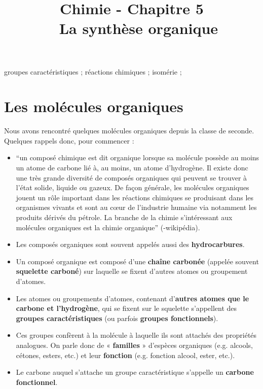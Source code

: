 \documentclass[11pt,a4paper]{article}
\title{\large Chimie - Chapitre 5 \\ \LARGE  La synthèse organique}
\date{}
\author{}
\begin{document}
\vspace{-2cm}

\maketitle
\vspace{-1cm}
\begin{tcolorbox}[title=Notions de la classe de première à rappeler]
groupes caractéristiques ; réactions chimiques ; isomérie ; 
\end{tcolorbox}
\tableofcontents

\section{Les molécules organiques}
Nous avons rencontré quelques molécules organiques depuis la classe de seconde. Quelques rappels donc, pour commencer : 

\begin{defn}{}
\begin{itemize}
    \item ``un composé chimique est dit organique lorsque sa molécule possède au moins un atome de carbone lié à, au moins, un atome d'hydrogène. Il existe donc une très grande diversité de composés organiques qui peuvent se trouver à l'état solide, liquide ou gazeux. De façon générale, les molécules organiques jouent un rôle important dans les réactions chimiques se produisant dans les organismes vivants et sont au cœur de l'industrie humaine via notamment les produits dérivés du pétrole. La branche de la chimie s'intéressant aux molécules organiques est la chimie organique'' (-wikipédia).
    \item Les composés organiques sont souvent appelés aussi des \textbf{hydrocarbures}.
    \item Un composé organique est composé d’une \textbf{chaîne carbonée} (appelée souvent \textbf{squelette carboné}) sur laquelle se fixent d’autres atomes ou groupement d’atomes.
    \item Les atomes ou groupements d’atomes, contenant d'\textbf{autres atomes que le carbone et l'hydrogène}, qui se fixent sur le squelette s’appellent des \textbf{groupes caractéristiques} (ou parfois \textbf{groupes fonctionnels}).
    \item Ces groupes confèrent à la molécule à laquelle ils sont attachés des propriétés analogues. On parle donc de « \textbf{familles} » d’espèces organiques (e.g. alcools, cétones, esters, etc.) et leur \textbf{fonction} (e.g. fonction alcool, ester, etc.).
    \item Le carbone auquel s'attache un groupe caractéristique s'appelle un \textbf{carbone fonctionnel}. 
\end{itemize}
\end{defn}
\end{document}

